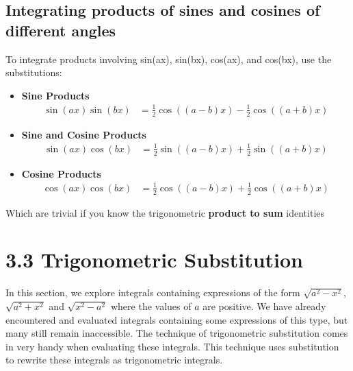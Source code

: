 \documentclass{report}
\begin{document}
    \subsection*{Integrating products of sines and cosines of different angles}
    \bigbreak \noindent 
    \begin{thrm}
       To integrate products involving  sin(ax), sin(bx), cos(ax), and  cos(bx), use the substitutions:
       \begin{itemize}
           \item \textbf{Sine Products}
            \begin{align*}
                \sin(ax) \sin(bx) &= \frac{1}{2} \cos((a-b)x) - \frac{1}{2} \cos((a+b)x)
            \end{align*}

            \item \textbf{Sine and Cosine Products}
            \begin{align*}
                \sin(ax) \cos(bx) &= \frac{1}{2} \sin((a-b)x) + \frac{1}{2} \sin((a+b)x)
            \end{align*}

            \item \textbf{Cosine Products}
            \begin{align*}
                \cos(ax) \cos(bx) &= \frac{1}{2} \cos((a-b)x) + \frac{1}{2} \cos((a+b)x)
            \end{align*}
       \end{itemize}
       \bigbreak \noindent 
       Which are trivial if you know the trigonometric \textbf{product to sum} identities
    \end{thrm}

    \pagebreak 
    \section*{3.3 Trigonometric Substitution}
    \bigbreak \noindent 
    In this section, we explore integrals containing expressions of the form  $\sqrt{a^2 - x^2}$, $\sqrt{a^2 + x^2}$ and $\sqrt{x^2 - a^2}$
    where the values of \( a \) are positive. We have already encountered and evaluated integrals containing some expressions of this type, but many still remain inaccessible. The technique of trigonometric substitution comes in very handy when evaluating these integrals. This technique uses substitution to rewrite these integrals as trigonometric integrals.
\end{document}
